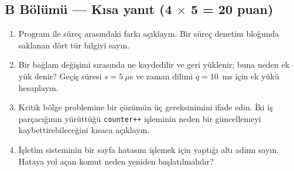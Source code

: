 \subsection*{B Bölümü --- Kısa yanıt \hfill (4 $\times$ 5 = 20 puan)}
\begin{enumerate}[leftmargin=2.0em,label=B\arabic*.,itemsep=0.4em]
  \item Program ile süreç arasındaki farkı açıklayın. Bir süreç denetim bloğunda saklanan dört tür bilgiyi sayın.
  \item Bir bağlam değişimi sırasında ne kaydedilir ve geri yüklenir; buna neden ek yük denir? Geçiş süresi $s = 5\ \mu$s ve zaman dilimi $q = 10$~ms için ek yükü hesaplayın.
  \item Kritik bölge problemine bir çözümün üç gereksinimini ifade edin. İki iş parçacığının yürüttüğü \texttt{counter++} işleminin neden bir güncellemeyi kaybettirebileceğini kısaca açıklayın.
  \item İşletim sisteminin bir sayfa hatasını işlemek için yaptığı altı adımı sayın. Hataya yol açan komut neden yeniden başlatılmalıdır?
\end{enumerate}

